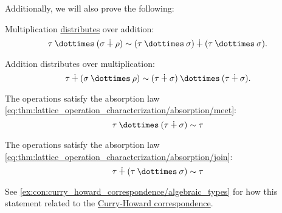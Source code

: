 \begin{proposition}
  Additionally, we will also prove the following:
  \begin{thmenum}[resume=thm:simple_algebraic_type_arithmetic]
     Multiplication \hyperref[def:semiring]{distributes} over addition:
    \begin{equation}\label{eq:thm:simple_algebraic_type_arithmetic/multiplication_distributes}
      \tau \syntimes (\sigma \synplus \rho) \sim (\tau \syntimes \sigma) \synplus (\tau \syntimes \sigma).
    \end{equation}

     Addition distributes over multiplication:
    \begin{equation}\label{eq:thm:simple_algebraic_type_arithmetic/addition_distributes}
      \tau \synplus (\sigma \syntimes \rho) \sim (\tau \synplus \sigma) \syntimes (\tau \synplus \sigma).
    \end{equation}

     The operations satisfy the absorption law \eqref{eq:thm:lattice_operation_characterization/absorption/meet}:
    \begin{equation}\label{eq:thm:simple_algebraic_type_arithmetic/multiplication_absorbs}
      \tau \syntimes (\tau \synplus \sigma) \sim \tau
    \end{equation}

     The operations satisfy the absorption law \eqref{eq:thm:lattice_operation_characterization/absorption/join}:
    \begin{equation}\label{eq:thm:simple_algebraic_type_arithmetic/addition_absorbs}
      \tau \synplus (\tau \syntimes \sigma) \sim \tau
    \end{equation}
  \end{thmenum}
\end{proposition}
\begin{comments}
  \item See \cref{ex:con:curry_howard_correspondence/algebraic_types} for how this statement related to the \hyperref[con:curry_howard_correspondence]{Curry-Howard correspondence}.
\end{comments}
